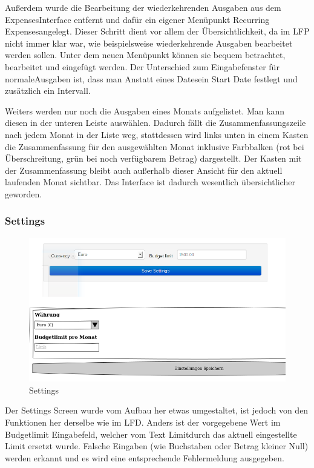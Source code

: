 \documentclass[a4paper,10pt]{article}
\begin{document}
Au\ss erdem wurde die Bearbeitung der wiederkehrenden Ausgaben aus dem
\glqq Expenses\grqq\space Interface entfernt und daf\"ur
ein eigener Men\"upunkt \glqq Recurring Expenses\grqq\space angelegt. Dieser Schritt
dient vor allem der \"Ubersichtlichkeit, da im LFP nicht immer klar war, wie
beispielsweise wiederkehrende Ausgaben bearbeitet werden sollen. Unter dem neuen
Men\"upunkt k\"onnen sie bequem betrachtet, bearbeitet und eingef\"ugt werden. Der Unterschied zum
Eingabefenster f\"ur \glqq normale\grqq\space Ausgaben ist,
dass man Anstatt eines \glqq Dates\grqq\space ein \glqq Start Date\grqq\space
festlegt und zus\"atzlich ein Intervall.

Weiters werden nur noch die Ausgaben eines Monats aufgelistet. Man kann diesen in der
unteren Leiste ausw\"ahlen. Dadurch f\"allt
die Zusammenfassungszeile nach jedem Monat in der Liste weg, stattdessen wird links unten in einem Kasten die Zusammenfassung
f\"ur den ausgew\"ahlten Monat inklusive Farbbalken (rot bei \"Uberschreitung, gr\"un bei noch verf\"ugbarem Betrag) dargestellt.
Der Kasten mit der Zusammenfassung bleibt auch au\ss erhalb dieser Ansicht f\"ur den
aktuell laufenden Monat sichtbar.
Das Interface ist dadurch wesentlich \"ubersichtlicher geworden.

\clearpage
\subsubsection{Settings}

\begin{figure}
\centering
\includegraphics[width=\textwidth]{settings}
\caption{Settings} \label{fig:settings}
\end{figure}

Der Settings Screen wurde vom Aufbau her etwas umgestaltet, ist jedoch von den Funktionen her derselbe wie im LFD. Anders ist 
der vorgegebene Wert im Budgetlimit Eingabefeld, welcher vom Text \glqq
Limit\grqq\space durch das aktuell eingestellte Limit ersetzt
wurde. Falsche Eingaben (wie Buchstaben oder Betrag kleiner Null) werden erkannt und es wird eine entsprechende Fehlermeldung ausgegeben.
\end{document}
